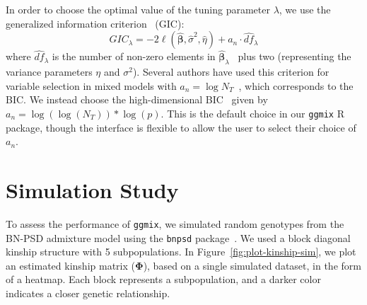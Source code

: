 \documentclass[12pt,letter]{article}\usepackage[]{graphicx}\usepackage[]{color}
\newcommand{\bbeta}{\boldsymbol{\beta}}
\newcommand{\bPhi}{\boldsymbol{\Phi}}
\begin{document}
In order to choose the optimal value of the tuning parameter $\lambda$, we use the generalized information criterion~\citep{nishii1984asymptotic} (GIC):
\begin{equation}
	GIC_{\lambda} = -2 \ell(\widehat{\bbeta}, \widehat{\sigma}^2, \widehat{\eta}) + a_n \cdot \widehat{df}_{\lambda}
\end{equation}
where $\widehat{df}_{\lambda}$ is the number of non-zero elements in $\widehat{\bbeta}_{\lambda}$~\citep{zou2007degrees} plus two (representing the variance parameters $\eta$ and $\sigma^2$). Several authors have used this criterion for variable selection in mixed models with $a_n = \log N_T$~\citep{bondell2010joint,schelldorfer2011estimation}, which corresponds to the BIC. We instead choose the high-dimensional BIC~\citep{fan2013tuning} given by $a_n = \log(\log(N_T)) * \log(p)$. This is the default choice in our \texttt{ggmix} R package, though the interface is flexible to allow the user to select their choice of $a_n$.



\section{Simulation Study}

To assess the performance of \texttt{ggmix}, we simulated random genotypes from the BN-PSD admixture model using the \texttt{bnpsd} package~\citep{bnpsd1,bnpsd2}.
We used a block diagonal kinship structure with 5 subpopulations.
In Figure~\ref{fig:plot-kinship-sim}, we plot an estimated kinship matrix  ($\bPhi$), based on a single simulated dataset, in the form of a heatmap.
Each block represents a subpopulation, and a darker color indicates a closer genetic relationship.
\end{document}
